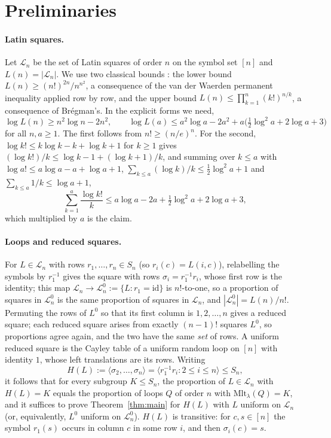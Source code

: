 \documentclass[11pt]{amsart}
\theoremstyle{plain}
\theoremstyle{remark}
\newcommand{\LL}{\mathcal{L}}
\begin{document}
\section{Preliminaries}

\paragraph{Latin squares.}  Let $\LL_n$ be the set of Latin squares of
order $n$ on the symbol set $[n]$ and $L(n)=|\LL_n|$.  We use two
classical bounds \cite[Ch.~17]{vLW}: the lower bound
$L(n)\ge(n!)^{2n}/n^{n^2}$, a consequence of the van der Waerden
permanent inequality applied row by row, and the upper bound
$L(n)\le\prod_{k=1}^n(k!)^{n/k}$, a consequence of Br\'egman's.  In the
explicit forms we need,
\begin{equation}\label{eq:L}
\log L(n)\ge n^2\log n-2n^2,\qquad
\log L(a)\le a^2\log a-2a^2+a\bigl(\tfrac12\log^2a+2\log a+3\bigr)
\end{equation}
for all $n,a\ge1$.  The first follows from $n!\ge(n/e)^n$.  For the
second, $\log k!\le k\log k-k+\log k+1$ for $k\ge1$ gives
$(\log k!)/k\le\log k-1+(\log k+1)/k$, and summing over $k\le a$ with
$\log a!\le a\log a-a+\log a+1$, $\sum_{k\le a}(\log k)/k\le\frac12\log^2a+1$
and $\sum_{k\le a}1/k\le\log a+1$,
\[
\sum_{k=1}^a\frac{\log k!}k\le a\log a-2a+\tfrac12\log^2a+2\log a+3,
\]
which multiplied by $a$ is the claim.

\paragraph{Loops and reduced squares.}  For $L\in\LL_n$ with rows
$r_1,\dots,r_n\in S_n$ (so $r_i(c)=L(i,c)$), relabelling the symbols by
$r_1^{-1}$ gives the square with rows $\sigma_i=r_1^{-1}r_i$, whose
first row is the identity; this map $\LL_n\to\LL_n^0:=\{L:r_1=\mathrm{id}\}$
is $n!$-to-one, so a proportion of squares in $\LL_n^0$ is the same proportion
of squares in $\LL_n$, and $|\LL_n^0|=L(n)/n!$.  Permuting the rows of $L^0$ so that its first
column is $1,2,\dots,n$ gives a reduced square; each reduced square
arises from exactly $(n-1)!$ squares $L^0$, so proportions agree again,
and the two have the same \emph{set} of rows.
A uniform reduced square is the Cayley table of a uniform random loop
on $[n]$ with identity $1$, whose left translations are its rows.
Writing
\[
H(L):=\langle\sigma_2,\dots,\sigma_n\rangle=\langle r_1^{-1}r_i:2\le i\le n\rangle\le S_n,
\]
it follows that for every subgroup $K\le S_n$, the proportion of $L\in\LL_n$ with $H(L)=K$ equals the proportion of loops $Q$ of order $n$ with $\mathrm{Mlt}_\lambda(Q)=K$, and it suffices to prove Theorem~\ref{thm:main} for $H(L)$ with $L$ uniform on $\LL_n$ (or, equivalently, $L^0$ uniform on $\LL_n^0$).
$H(L)$ is transitive: for $c,s\in[n]$ the symbol $r_1(s)$ occurs in column $c$ in some row $i$,
and then $\sigma_i(c)=s$.
\end{document}
